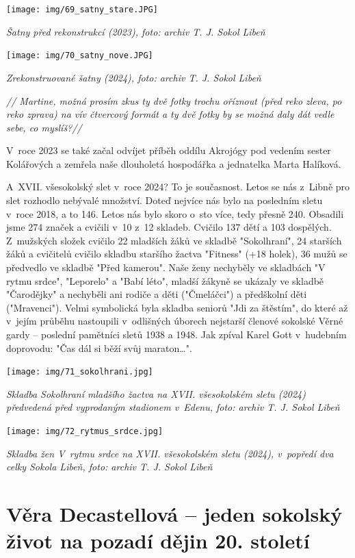 \documentclass[a5paper, 11pt, twoside]{article}
\begin{document}
 \texttt{[image: img/69\_satny\_stare.JPG]}

\textit{Šatny před rekonstrukcí (2023), foto: archiv T. J. Sokol Libeň}

 \texttt{[image: img/70\_satny\_nove.JPG]}

\textit{Zrekonstruované šatny (2024), foto: archiv T. J. Sokol Libeň}

\textit{// Martine, možná prosím zkus ty dvě fotky trochu oříznout (před
reko zleva, po reko zprava) na vív čtvercový formát a ty dvě fotky by se
možná daly dát vedle sebe, co myslíš?//}

V~roce 2023 se také začal odvíjet příběh oddílu Akrojógy pod vedením
sester Kolářových a zemřela naše dlouholetá hospodářka a jednatelka
Marta Halíková.

A~XVII. všesokolský slet v~roce 2024? To je současnost. Letos se nás
z~Libně pro slet rozhodlo nebývalé množství. Doteď nejvíce nás bylo na
posledním sletu v~roce 2018, a to 146. Letos nás bylo skoro o~sto více,
tedy přesně 240. Obsadili jsme 274 značek a cvičili v~10 z~12 skladeb.
Cvičilo 137 dětí a 103 dospělých. Z~mužských složek cvičilo 22 mladších
žáků ve skladbě "Sokolhraní", 24 starších žáků a cvičitelů cvičilo
skladbu staršího žactva "Fitness" (+18 holek), 36 mužů se předvedlo ve
skladbě "Před kamerou". Naše ženy nechyběly ve skladbách "V rytmu
srdce", "Leporelo" a "Babí léto", mladší žákyně se ukázaly ve
skladbě "Čarodějky" a nechyběli ani rodiče a děti ("Čmeláčci") a
předškolní děti ("Mravenci"). Velmi symbolická byla skladba seniorů
"Jdi za štěstím", do které až v~jejím průběhu nastoupili v~odlišných
úborech nejstarší členové sokolské Věrné gardy -- poslední pamětníci
sletů 1938 a 1948. Jak zpíval Karel Gott v~hudebním doprovodu: "Čas dál
si běží svůj maraton\ldots".

 \texttt{[image: img/71\_sokolhrani.jpg]}

\textit{Skladba Sokolhraní mladšího žactva na XVII. všesokolském sletu
(2024) předvedená před vyprodaným stadionem v~Edenu, foto: archiv T. J.
Sokol Libeň}

 \texttt{[image: img/72\_rytmus\_srdce.jpg]}

\textit{Skladba žen V~rytmu srdce na XVII. všesokolském sletu (2024),
v~popředí dva celky Sokola Libeň, foto: archiv T. J. Sokol Libeň}

\section{Věra Decastellová -- jeden sokolský život na pozadí dějin 20.
století}
\end{document}
